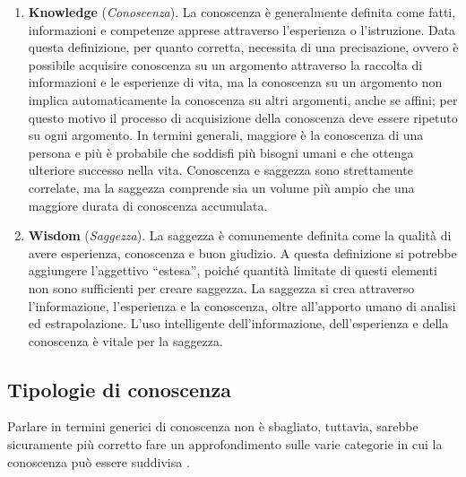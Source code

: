 \begin{enumerate}
    \item \textbf{Knowledge} (\textit{Conoscenza}). La conoscenza è generalmente definita come fatti, informazioni e competenze apprese attraverso l'esperienza o l'istruzione. Data questa definizione, per quanto corretta, necessita di una precisazione, ovvero è possibile acquisire conoscenza su un argomento attraverso la raccolta di informazioni e le esperienze di vita, ma la conoscenza su un argomento non implica automaticamente la conoscenza su altri argomenti, anche se affini; per questo motivo il processo di acquisizione della conoscenza deve essere ripetuto su ogni argomento. In termini generali, maggiore è la conoscenza di una persona e più è probabile che soddisfi più bisogni umani e che ottenga ulteriore successo nella vita. Conoscenza e saggezza sono strettamente correlate, ma la saggezza comprende sia un volume più ampio che una maggiore durata di conoscenza accumulata.
    \item \textbf{Wisdom} (\textit{Saggezza}). La saggezza è comunemente definita come la qualità di avere esperienza, conoscenza e buon giudizio. A questa definizione si potrebbe aggiungere l'aggettivo “estesa”, poiché quantità limitate di questi elementi non sono sufficienti per creare saggezza. La saggezza si crea attraverso l'informazione, l'esperienza e la conoscenza, oltre all'apporto umano di analisi ed estrapolazione. L'uso intelligente dell'informazione, dell'esperienza e della conoscenza è vitale per la saggezza.
\end{enumerate}

\subsection{Tipologie di conoscenza}

Parlare in termini generici di conoscenza non è sbagliato, tuttavia, sarebbe sicuramente più corretto fare un approfondimento sulle varie categorie in cui la conoscenza può essere suddivisa \cite{getguru_types_of_knowledge}.

